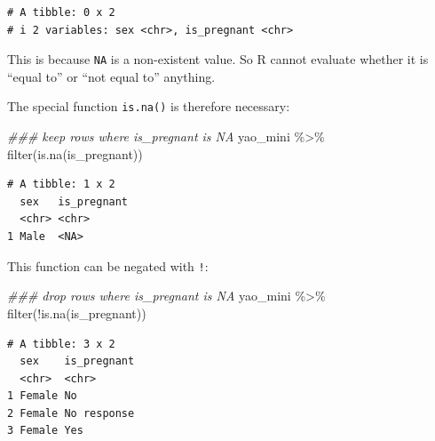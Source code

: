 \documentclass[
  letterpaper,
  DIV=11,
  numbers=noendperiod]{scrreprt}
\newenvironment{Shaded}{\begin{snugshade}}{\end{snugshade}}
\newcommand{\DocumentationTok}[1]{\textcolor[rgb]{0.37,0.37,0.37}{\textit{#1}}}
\newcommand{\FunctionTok}[1]{\textcolor[rgb]{0.28,0.35,0.67}{#1}}
\newcommand{\NormalTok}[1]{\textcolor[rgb]{0.00,0.23,0.31}{#1}}
\newcommand{\SpecialCharTok}[1]{\textcolor[rgb]{0.37,0.37,0.37}{#1}}
\begin{document}
\begin{verbatim}
# A tibble: 0 x 2
# i 2 variables: sex <chr>, is_pregnant <chr>
\end{verbatim}

This is because \texttt{NA} is a non-existent value. So R cannot
evaluate whether it is ``equal to'' or ``not equal to'' anything.

The special function \texttt{is.na()} is therefore necessary:

\begin{Shaded}
\begin{Highlighting}[]
\DocumentationTok{\#\#\# keep rows where \textasciigrave{}is\_pregnant\textasciigrave{} is NA}
\NormalTok{yao\_mini }\SpecialCharTok{\%\textgreater{}\%} \FunctionTok{filter}\NormalTok{(}\FunctionTok{is.na}\NormalTok{(is\_pregnant)) }
\end{Highlighting}
\end{Shaded}

\begin{verbatim}
# A tibble: 1 x 2
  sex   is_pregnant
  <chr> <chr>      
1 Male  <NA>       
\end{verbatim}

This function can be negated with \texttt{!}:

\begin{Shaded}
\begin{Highlighting}[]
\DocumentationTok{\#\#\# drop rows where \textasciigrave{}is\_pregnant\textasciigrave{} is NA}
\NormalTok{yao\_mini }\SpecialCharTok{\%\textgreater{}\%} \FunctionTok{filter}\NormalTok{(}\SpecialCharTok{!}\FunctionTok{is.na}\NormalTok{(is\_pregnant))}
\end{Highlighting}
\end{Shaded}

\begin{verbatim}
# A tibble: 3 x 2
  sex    is_pregnant
  <chr>  <chr>      
1 Female No         
2 Female No response
3 Female Yes        
\end{verbatim}
\end{document}
